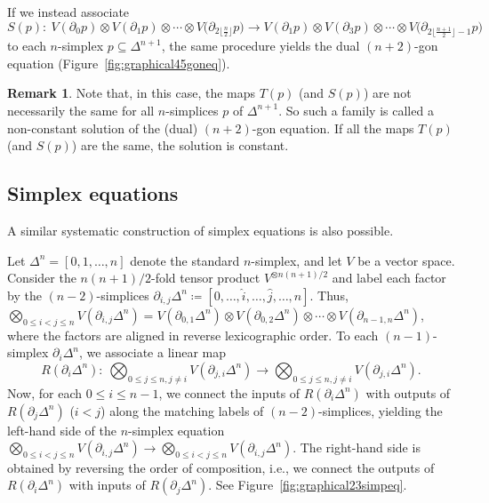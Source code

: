 \documentclass[pdftex]{sigma}
\numberwithin{equation}{section}
\theoremstyle{definition}
\newtheorem{Remark}[Theorem]{Remark}
\begin{document}
If we instead associate
\begin{equation*}
 S(p)\colon \ V(\partial_0 p)\otimes V(\partial_1 p)\otimes\cdots\otimes V\bigl(\partial_{2\lfloor\frac{n}{2}\rfloor} p\bigr)\to V(\partial_1 p)\otimes V(\partial_3 p)\otimes\cdots\otimes V\bigl(\partial_{2\lfloor\frac{n+1}{2}\rfloor-1} p\bigr)
\end{equation*}
to each $n$-simplex $p\subseteq\Delta^{n+1}$, the same procedure yields the dual $(n+2)$-gon equation (Figure~\ref{fig:graphical45goneq}).

\begin{Remark}
 Note that, in this case, the maps $T(p)$ (and $S(p)$) are not necessarily the same for all $n$-simplices $p$ of $\Delta^{n+1}$. So such a family is called a non-constant solution of the (dual) $(n+2)$-gon equation. If all the maps $T(p)$ (and $S(p)$) are the same, the solution is constant.
\end{Remark}



\subsection{Simplex equations}

A similar systematic construction of simplex equations is also possible.

Let $\Delta^n=[0,1,\dots,n]$ denote the standard $n$-simplex, and let $V$ be a vector space.
Consider the $n(n+1)/2$-fold tensor product $V^{\otimes n(n+1)/2}$ and label each factor by the $(n-2)$-simplices $\partial_{i,j}\Delta^n\coloneqq [0,\dots,\hat{i},\dots,\hat{j},\dots, n]$. Thus, $\bigotimes_{0\leq i<j\leq n}V(\partial_{i,j}\Delta^n) = V(\partial_{0,1}\Delta^n)\otimes V(\partial_{0,2}\Delta^n)\otimes\cdots\otimes V(\partial_{n-1,n}\Delta^n)$, where the factors are aligned in reverse lexicographic order. To each $(n-1)$-simplex $\partial_i\Delta^{n}$, we associate a linear map
\begin{equation*}
 R(\partial_i\Delta^{n}) \colon \ \bigotimes_{0\leq j \leq n, j\neq i} V(\partial_{j,i} \Delta^n) \to \bigotimes_{0\leq j \leq n, j\neq i} V(\partial_{j,i} \Delta^n).
\end{equation*}
Now, for each $0 \leq i \leq n-1$, we connect the inputs of $R(\partial_i\Delta^{n})$ with outputs of $R(\partial_j\Delta^{n})$ ($i<j$) along the matching labels of $(n-2)$-simplices, yielding the left-hand side of the $n$-simplex equation $\bigotimes_{0\leq i<j\leq n}V(\partial_{i,j}\Delta^n) \to \bigotimes_{0\leq i<j\leq n}V(\partial_{i,j}\Delta^n)$. The right-hand side is obtained by reversing the order of composition, i.e., we connect the outputs of $R(\partial_i\Delta^{n})$ with inputs of $R(\partial_j\Delta^{n})$. See Figure~\ref{fig:graphical23simpeq}.
\end{document}
